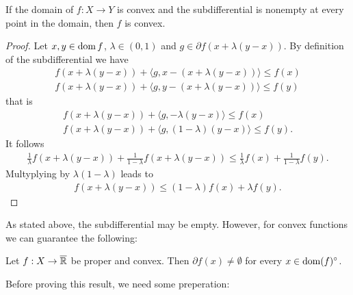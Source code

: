 \begin{lemma}
    If the domain of $f:X\rightarrow Y$ is convex and the subdifferential is nonempty at every point in the domain, then $f$ is convex.
\end{lemma}
\begin{proof}
    Let $x,y\in \operatorname{\mathrm{dom}} f$, $\lambda\in (0,1)$ and $g\in \partial f(x+\lambda (y-x))$.
    By definition of the subdifferential we have
    \begin{gather}
        f(x+\lambda(y-x)) + \langle g, x - (x+\lambda(y-x))\rangle \leq f(x)\\
        f(x+\lambda(y-x)) + \langle g, y - (x+\lambda(y-x))\rangle \leq f(y)
    \end{gather}
    that is
    \begin{gather}
        f(x+\lambda(y-x)) + \langle g, -\lambda(y-x)\rangle \leq f(x)\\
        f(x+\lambda(y-x)) + \langle g, (1-\lambda)(y - x) \rangle \leq f(y).
    \end{gather}
    It follows
    \begin{equation}
        \begin{aligned}
            \frac{1}{\lambda} f(x+\lambda(y-x)) + \frac{1}{1-\lambda} f(x+\lambda(y-x))\leq \frac{1}{\lambda} f(x) + \frac{1}{1-\lambda} f(y).
        \end{aligned}
    \end{equation}
    Multyplying by $\lambda (1-\lambda)$ leads to 
    \begin{equation}
        \begin{aligned}
            f(x+\lambda(y-x)) \leq (1-\lambda) f(x) + \lambda f(y).
        \end{aligned}
    \end{equation}
\end{proof}


As stated above, the subdifferential may be empty. However, for convex functions we can guarantee the following:

\begin{theorem}\label{convexity:thm:nonempty_subgrad}
    Let $f:X\rightarrow\overline{\mathbb{R}}$ be proper and convex. Then $\partial f(x)\neq \emptyset$ for every $x\in \operatorname{\mathrm{dom}}(f)^\circ$.
\end{theorem}
Before proving this result, we need some preperation:

